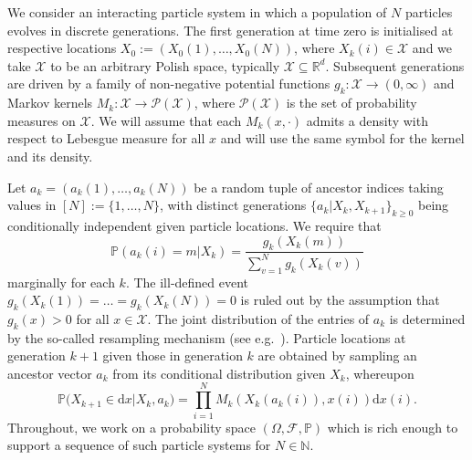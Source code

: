 \documentclass[a4paper,11pt]{article}
\theoremstyle{definition}
\newcommand{\bbP}{\mathbb{P}}
\newcommand{\bbN}{\mathbb{N}}
\newcommand{\bbR}{\mathbb{R}}
\newcommand{\rmd}{\mathrm{d}}
\newcommand{\calX}{\mathcal{X}}
\newcommand{\calP}{\mathcal{P}}
\begin{document}
We consider an interacting particle system in which a population of $N$ particles evolves in discrete generations.
The first generation at time zero is initialised at respective locations $X_0 := ( X_0( 1 ), \ldots, X_0( N ) )$, where $X_k(i) \in \mathcal{X}$ and we take $\mathcal{X}$ to be an arbitrary Polish space, typically $\calX \subseteq \bbR^d$.
Subsequent generations are driven by a family of non-negative potential functions $g_k : \calX \to (0, \infty)$ and Markov kernels $M_k : \calX \to \calP( \calX )$, where $\calP( \calX )$ is the set of probability measures on $\calX$.
We will assume that each $M_k(x,\cdot)$ admits a density with respect to Lebesgue measure for all $x$ and will use the same symbol for the kernel and its density.

Let $a_k = ( a_k( 1 ), \ldots, a_k( N ) )$ be a random tuple of ancestor indices taking values in $[ N ] := \{ 1, \ldots, N \}$, with distinct generations $\{ a_k | X_k, X_{ k + 1 } \}_{ k \geq 0 }$ being conditionally independent given particle locations.
We require that
\begin{equation*}
\bbP( a_k( i ) = m | X_k ) = \frac{ g_k( X_k( m ) ) }{ \sum_{ v = 1 }^N g_k( X_k( v ) ) }
\end{equation*}
marginally for each $k$.
The ill-defined event $g_k(X_k(1)) = \ldots = g_k(X_k(N)) = 0$ is ruled out by the assumption that $g_k(x) > 0$ for all $x \in \calX$.
The joint distribution of the entries of $a_k$ is determined by the so-called resampling mechanism (see e.g.\ \cite[Chapter 9]{chopin2020}).
Particle locations at generation $k + 1$ given those in generation $k$ are obtained by sampling an ancestor vector $a_k$ from its conditional distribution given $X_k$, whereupon
\begin{equation*}
\bbP\Bigg( X_{ k + 1 } \in \rmd x \Big| X_k, a_k \Bigg) = \prod_{ i = 1 }^N M_k( X_k( a_k( i ) ), x( i ) ) \rmd x( i ).
\end{equation*}
Throughout, we work on a probability space $( \Omega, \mathcal{F}, \bbP )$ which is rich enough to support a sequence of such particle systems for $N \in \bbN$.
\end{document}
